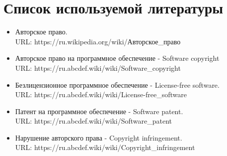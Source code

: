 \documentclass[12pt, oneside, a4paper]{article}
\begin{document}
\begin{sloppypar}
\newpage


\section{Список используемой литературы}
\begin{itemize}
 \item Авторское право.\\
 URL: https://ru.wikipedia.org/wiki/Авторское\_право
 
 \item Авторское право на программное обеспечение - Software copyright\\
 URL: https://ru.abcdef.wiki/wiki/Software\_copyright
 
 \item Безлицензионное программное обеспечение - License-free software.\\
 URL: https://ru.abcdef.wiki/wiki/License-free\_software
 
  \item Патент на программное обеспечение - Software patent.\\
 URL: https://ru.abcdef.wiki/wiki/Software\_patent
 
   \item Нарушение авторского права - Copyright infringement.\\
 URL: https://ru.abcdef.wiki/wiki/Copyright\_infringement

\end{itemize}
\end{sloppypar}
\end{document}

